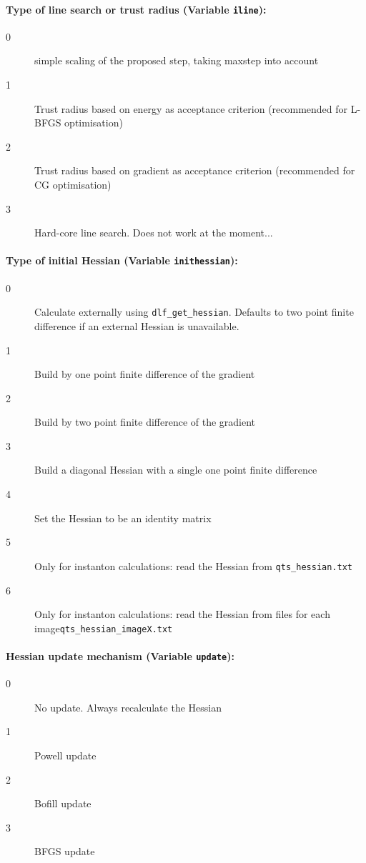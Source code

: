 \documentclass{article}
\begin{document}
\paragraph{Type of line search or trust radius (Variable \texttt{iline}):}
\begin{description}
\item[0]   simple scaling of the proposed step, taking maxstep into account
\item[1]   Trust radius based on energy as acceptance criterion (recommended
  for L-BFGS optimisation)
\item[2]   Trust radius based on gradient as acceptance criterion (recommended
  for CG optimisation)
\item[3]   Hard-core line search. Does not work at the moment...
\end{description}

\paragraph{Type of initial Hessian (Variable \texttt{inithessian}):}
\begin{description}
\item[0]   Calculate externally using \texttt{dlf\_get\_hessian}. Defaults to two point finite
  difference if an external Hessian is unavailable.
\item[1]   Build by one point finite difference of the gradient
\item[2]   Build by two point finite difference of the gradient
\item[3]   Build a diagonal Hessian with a single one point finite difference
\item[4]   Set the Hessian to be an identity matrix
\item[5]   Only for instanton calculations: read the Hessian from \texttt{qts\_hessian.txt}
\item[6]   Only for instanton calculations: read the Hessian from files
  for each image\texttt{qts\_hessian\_imageX.txt}
\end{description}

\paragraph{Hessian update mechanism (Variable \texttt{update}):}
\begin{description}
\item[0]   No update. Always recalculate the Hessian
\item[1]   Powell update \cite{pow71}
\item[2]   Bofill update \cite{bof94}
\item[3]   BFGS update
\end{description}
\end{document}
